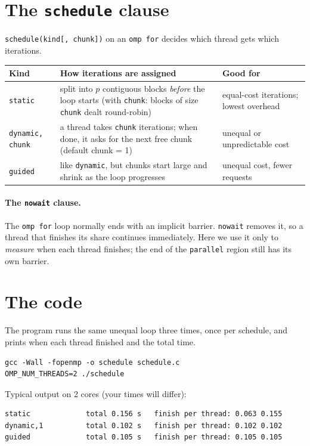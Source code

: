 \documentclass[11pt,a4paper]{article}
\begin{document}
\section{The \texttt{schedule} clause}
\texttt{schedule(kind[, chunk])} on an \texttt{omp for} decides which thread gets which
iterations.
\begin{center}
\small
\begin{tabular}{@{}>{\raggedright\arraybackslash}p{3.0cm}>{\raggedright\arraybackslash}p{8.2cm}>{\raggedright\arraybackslash}p{4.0cm}@{}}
\toprule
Kind & How iterations are assigned & Good for \\ \midrule
\texttt{static} & split into $p$ contiguous blocks \emph{before} the loop starts
  (with \texttt{chunk}: blocks of size \texttt{chunk} dealt round-robin) & equal-cost iterations; lowest overhead \\
\texttt{dynamic, chunk} & a thread takes \texttt{chunk} iterations; when done, it asks for the
  next free chunk (default chunk = 1) & unequal or unpredictable cost \\
\texttt{guided} & like \texttt{dynamic}, but chunks start large and shrink as the loop
  progresses & unequal cost, fewer requests \\
\bottomrule
\end{tabular}
\end{center}

\paragraph{The \texttt{nowait} clause.} The \texttt{omp for} loop normally ends with an
implicit barrier. \texttt{nowait} removes it, so a thread that finishes its share continues
immediately. Here we use it only to \emph{measure} when each thread finishes; the end of the
\texttt{parallel} region still has its own barrier.

\section{The code}
The program runs the same unequal loop three times, once per schedule, and prints when
each thread finished and the total time.


\begin{lstlisting}[style=sh]
gcc -Wall -fopenmp -o schedule schedule.c
OMP_NUM_THREADS=2 ./schedule
\end{lstlisting}
Typical output on 2 cores (your times will differ):
\begin{lstlisting}[style=sh]
static             total 0.156 s   finish per thread: 0.063 0.155
dynamic,1          total 0.102 s   finish per thread: 0.102 0.102
guided             total 0.105 s   finish per thread: 0.105 0.105
\end{lstlisting}
\end{document}
